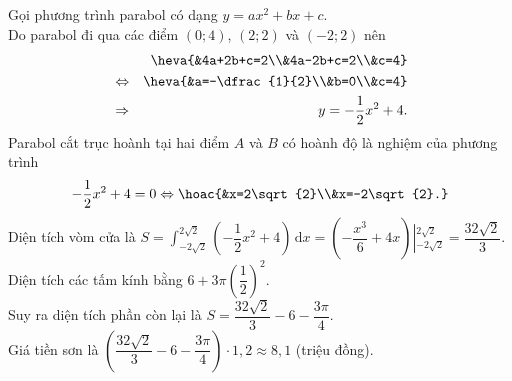 \begin{bt}
{\begin{center}
		\end{center}
		Gọi phương trình parabol có dạng  $y=ax^2+bx+c$.\\
		Do parabol đi qua các điểm $(0;4)$,  $(2;2)$ và $(-2;2)$ nên
		\begin{eqnarray*}
			 &&\heva{&4a+2b+c=2\\&4a-2b+c=2\\&c=4}\\
			&\Leftrightarrow&  \heva{&a=-\dfrac{1}{2}\\&b=0\\&c=4}\\
			 &\Rightarrow&y=-\dfrac{1}{2}x^2+4.
		\end{eqnarray*}
		Parabol cắt trục hoành tại hai  điểm $A$ và $B$ có hoành độ là nghiệm của phương trình
		\[-\dfrac{1}{2}x^2+4=0\Leftrightarrow  \hoac{&x=2\sqrt{2}\\&x=-2\sqrt{2}.}\]
		Diện tích vòm cửa là  $S=\displaystyle\int ^{2\sqrt{2}}_{-2\sqrt{2}}\left(-\dfrac{1}{2}x^2+4\right)\mathrm{\,d}x=\left(-\dfrac{x^3}{6}+4x\right)\left|^{2\sqrt{2}}_{-2\sqrt{2}}\right.=\dfrac{32\sqrt{2}}{3}$.\\
		Diện tích các tấm  kính bằng $6+3\pi\left(\dfrac{1}{2}\right)^2$.\\
		Suy ra diện tích phần  còn lại là $S=\dfrac{32\sqrt{2}}{3}-6-\dfrac{3\pi}{4}$.\\
		Giá tiền sơn là $\left(\dfrac{32\sqrt{2}}{3}-6-\dfrac{3\pi}{4}\right)\cdot 1{,}2\approx 8{,}1$ (triệu đồng). 
	 }
\end{bt}

